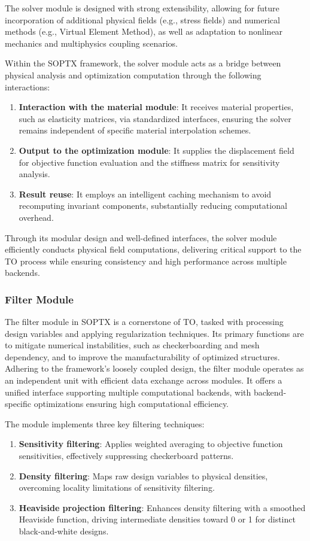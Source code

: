 \documentclass[mathpazo]{cicp}
\begin{document}
The solver module is designed with strong extensibility, allowing for future incorporation of additional physical fields (e.g., stress fields) and numerical methods (e.g., Virtual Element Method), as well as adaptation to nonlinear mechanics and multiphysics coupling scenarios.

Within the SOPTX framework, the solver module acts as a bridge between physical analysis and optimization computation through the following interactions:
\begin{enumerate}
	\item \textbf{Interaction with the material module}: It receives material properties, such as elasticity matrices, via standardized interfaces, ensuring the solver remains independent of specific material interpolation schemes.
	\item \textbf{Output to the optimization module}: It supplies the displacement field for objective function evaluation and the stiffness matrix for sensitivity analysis.
	\item \textbf{Result reuse}: It employs an intelligent caching mechanism to avoid recomputing invariant components, substantially reducing computational overhead.
\end{enumerate}
Through its modular design and well-defined interfaces, the solver module efficiently conducts physical field computations, delivering critical support to the TO process while ensuring consistency and high performance across multiple backends.

\subsubsection{Filter Module}
The filter module in SOPTX is a cornerstone of TO, tasked with processing design variables and applying regularization techniques. Its primary functions are to mitigate numerical instabilities, such as checkerboarding and mesh dependency, and to improve the manufacturability of optimized structures. Adhering to the framework’s loosely coupled design, the filter module operates as an independent unit with efficient data exchange across modules. It offers a unified interface supporting multiple computational backends, with backend-specific optimizations ensuring high computational efficiency.

The module implements three key filtering techniques:
\begin{enumerate}
	\item \textbf{Sensitivity filtering}: Applies weighted averaging to objective function sensitivities, effectively suppressing checkerboard patterns.
	\item \textbf{Density filtering}: Maps raw design variables to physical densities, overcoming locality limitations of sensitivity filtering.
	\item \textbf{Heaviside projection filtering}: Enhances density filtering with a smoothed Heaviside function, driving intermediate densities toward 0 or 1 for distinct black-and-white designs.
\end{enumerate}
\end{document}
